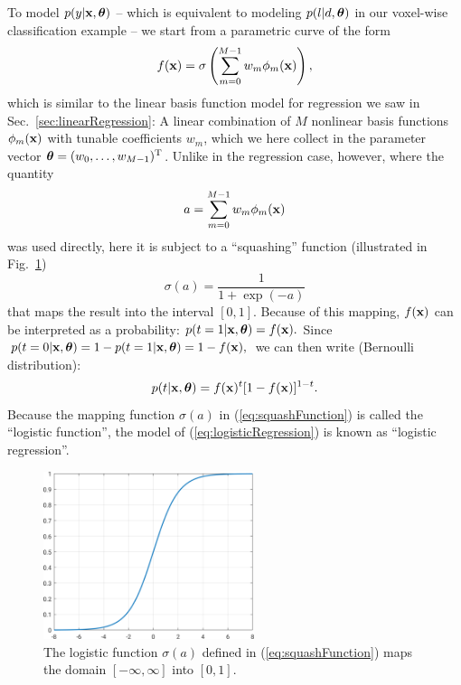 \documentclass[10pt,twoside]{book}
\begin{document}
To model $p( y | \mathbf{x}, {\mbox{\boldmath {${\theta}$}}} )$
-- which is equivalent to modeling $p( l | d, {\mbox{\boldmath {${\theta}$}}} )$ in our 
voxel-wise classification
example -- 
we start from a parametric curve of the form 
\begin{equation}
  f( \mathbf{x} ) = \sigma\left( \sum_{m=0}^{M-1} w_m \phi_m( \mathbf{x} ) \right),
  \label{eq:logisticRegression}
\end{equation}
which is similar to the linear basis function model for regression we saw in Sec.~\ref{sec:linearRegression}:
A linear combination of $M$ nonlinear basis functions $\phi_m(\mathbf{x})$ with tunable coefficients $w_m$,
which we here collect in the parameter vector ${\mbox{\boldmath {${\theta}$}}} = (w_0,\ldots,w_{M-1})^\mathrm{T}$.
Unlike in the regression case, however, 
where the 
quantity
\begin{equation}
  a = \sum_{m=0}^{M-1} w_m \phi_m( \mathbf{x} )
  \label{eq:activation}
\end{equation}
was used directly,
here it is subject to a ``squashing'' function 
(illustrated in Fig.~\ref{fig:squashFunction})
\begin{equation}
  \sigma( a ) = \frac{1}{1 + \exp(-a)}
  \label{eq:squashFunction}
\end{equation}
that maps the result into the interval $[ 0, 1 ]$.
%
Because of this mapping, $f(\mathbf{x})$ can be interpreted as a probability:
$
  p( t=1 | \mathbf{x}, {\mbox{\boldmath {${\theta}$}}} ) = f( \mathbf{x} )
  .
$
Since 
$
  p( t=0 | \mathbf{x}, {\mbox{\boldmath {${\theta}$}}} ) 
  = 1 - p( t=1 | \mathbf{x}, {\mbox{\boldmath {${\theta}$}}} )
  = 1 - f( \mathbf{x} )
  ,
$
we can then write (Bernoulli distribution):
\begin{equation}
  p( t | \mathbf{x}, {\mbox{\boldmath {${\theta}$}}} ) = f( \mathbf{x} )^t [ 1 - f( \mathbf{x} ) ]^{1-t}
  \label{eq:Bernoulli}
  .
\end{equation}
Because the mapping function $\sigma(a)$ in (\eqref{eq:squashFunction}) is called the ``logistic function'',
the model of (\eqref{eq:logisticRegression}) is known as ``logistic regression''.

\begin{figure}
  \centering
  \includegraphics[width=0.55\textwidth]{logisticFunction} 
  \caption{The logistic function $\sigma(a)$ defined in (\eqref{eq:squashFunction}) maps the domain $[ -\infty, \infty]$ into $[ 0, 1 ]$.}
  \label{fig:squashFunction}
\end{figure}
\end{document}
